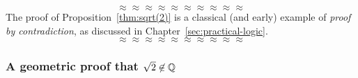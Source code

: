 \[ \approx \approx \approx \approx \approx \approx \approx \approx \approx \approx \]
The proof of Proposition~\ref{thm:sqrt(2)} is a classical (and early)
example of {\em proof by contradiction}, as discussed in
Chapter~\ref{sec:practical-logic}. 
\[ \approx \approx \approx \approx \approx \approx \approx \approx \approx \approx \]


\subsubsection{A geometric proof that $\sqrt{2} \not\in \mathbb{Q}$}
\label{sec:geom-proof-sqrt(2)}

